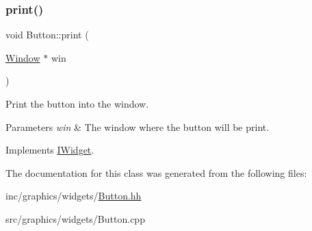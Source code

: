 \subsubsection{\texorpdfstring{print()}{print()}}
{\footnotesize\ttfamily void Button\+::print (\begin{DoxyParamCaption}\item[{\hyperlink{classWindow}{Window} $\ast$}]{win }\end{DoxyParamCaption})\hspace{0.3cm}{\ttfamily [virtual]}}



Print the button into the window. 


\begin{DoxyParams}{Parameters}
{\em win} & The window where the button will be print. \\
\hline
\end{DoxyParams}


Implements \hyperlink{classIWidget_a0cfa49a402e9bb31808a715e048ab2f4}{I\+Widget}.



The documentation for this class was generated from the following files\+:\begin{DoxyCompactItemize}
\item 
inc/graphics/widgets/\hyperlink{Button_8hh}{Button.\+hh}\item 
src/graphics/widgets/Button.\+cpp\end{DoxyCompactItemize}
